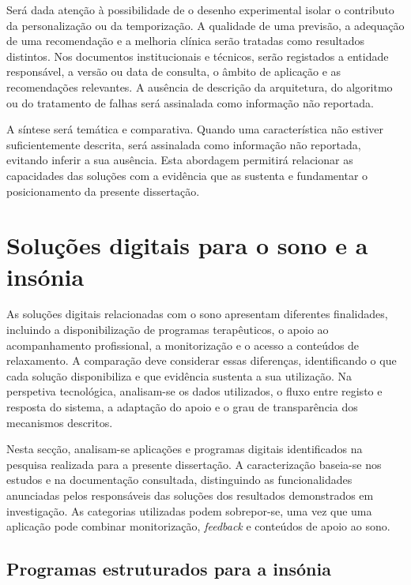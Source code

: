 Será dada atenção à possibilidade de o desenho experimental isolar o contributo da personalização ou da temporização. A qualidade de uma previsão, a adequação de uma recomendação e a melhoria clínica serão tratadas como resultados distintos. Nos documentos institucionais e técnicos, serão registados a entidade responsável, a versão ou data de consulta, o âmbito de aplicação e as recomendações relevantes. A ausência de descrição da arquitetura, do algoritmo ou do tratamento de falhas será assinalada como informação não reportada.

A síntese será temática e comparativa. Quando uma característica não estiver suficientemente descrita, será assinalada como informação não reportada, evitando inferir a sua ausência. Esta abordagem permitirá relacionar as capacidades das soluções com a evidência que as sustenta e fundamentar o posicionamento da presente dissertação.



\section{Soluções digitais para o sono e a insónia} 
\label{sec:chap3_solucoesDigitais} %

As soluções digitais relacionadas com o sono apresentam diferentes finalidades, incluindo a disponibilização de programas terapêuticos, o apoio ao acompanhamento profissional, a monitorização e o acesso a conteúdos de relaxamento. A comparação deve considerar essas diferenças, identificando o que cada solução disponibiliza e que evidência sustenta a sua utilização. Na perspetiva tecnológica, analisam-se os dados utilizados, o fluxo entre registo e resposta do sistema, a adaptação do apoio e o grau de transparência dos mecanismos descritos.

Nesta secção, analisam-se aplicações e programas digitais identificados na pesquisa realizada para a presente dissertação. A caracterização baseia-se nos estudos e na documentação consultada, distinguindo as funcionalidades anunciadas pelos responsáveis das soluções dos resultados demonstrados em investigação. As categorias utilizadas podem sobrepor-se, uma vez que uma aplicação pode combinar monitorização, \textit{feedback} e conteúdos de apoio ao sono.

\subsection{Programas estruturados para a insónia}

